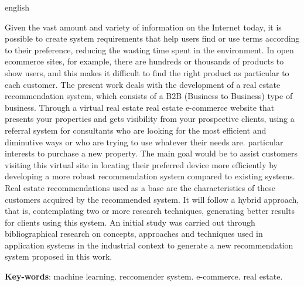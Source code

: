 \begin{resumo}[Abstract]
 \begin{otherlanguage*}{english}

Given the vast amount and variety of information on the Internet today, it is possible to create system requirements that help users find or use terms according to their preference, reducing the wasting time spent in the environment. In open ecommerce sites, for example, there are hundreds or thousands of products to show users, and this makes it difficult to find the right product as particular to each customer. The present work deals with the development of a real estate recommendation system, which consists of a B2B (Business to Business) type of business. Through a virtual real estate real estate e-commerce website that presents your properties and gets visibility from your prospective clients, using a referral system for consultants who are looking for the most efficient and diminutive ways or who are trying to use whatever their needs are. particular interests to purchase a new property. The main goal would be to assist customers visiting this virtual site in locating their preferred device more efficiently by developing a more robust recommendation system compared to existing systems. Real estate recommendations used as a base are the characteristics of these customers acquired by the recommended system. It will follow a hybrid approach, that is, contemplating two or more research techniques, generating better results for clients using this system. An initial study was carried out through bibliographical research on concepts, approaches and techniques used in application systems in the industrial context to generate a new recommendation system proposed in this work.

   \vspace{\onelineskip}
 
   \noindent 
   \textbf{Key-words}: machine learning. reccomender system. e-commerce. real estate.
 \end{otherlanguage*}
\end{resumo}
